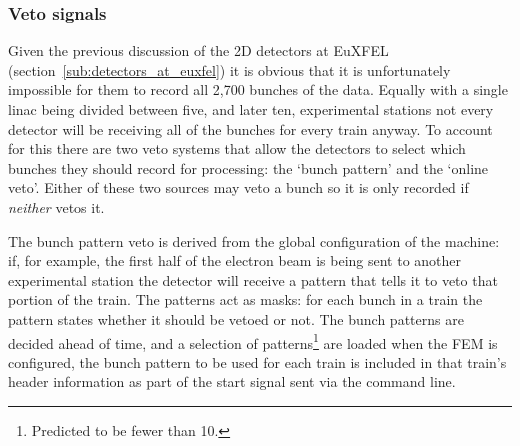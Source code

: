 \subsubsection{Veto signals} %
\label{sub:veto_signal}
Given the previous discussion of the 2D detectors at EuXFEL (section~\ref{sub:detectors_at_euxfel}) it is obvious that it is unfortunately impossible for them to record all 2,700 bunches of the data. Equally with a single linac being divided between five, and later ten, experimental stations not every detector will be receiving all of the bunches for every train anyway. To account for this there are two veto systems that allow the detectors to select which bunches they should record for processing: the `bunch pattern' and the `online veto'. Either of these two sources may veto a bunch so it is only recorded if \emph{neither} vetos it. 

The bunch pattern veto is derived from the global configuration of the machine: if, for example, the first half of the electron beam is being sent to another experimental station the detector will receive a pattern that tells it to veto that portion of the train. The patterns act as masks: for each bunch in a train the pattern states whether it should be vetoed or not. The bunch patterns are decided ahead of time, and a selection of patterns\footnote{Predicted to be fewer than 10.} are loaded when the FEM is configured, the bunch pattern to be used for each train is included in that train's header information as part of the start signal sent via the command line.

